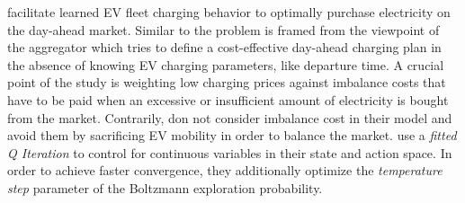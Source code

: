 \documentclass[12pt, article]{article}
\begin{document}
\textcite{vandael15_reinf_learn_heuris_ev_fleet} facilitate learned EV
fleet charging behavior to optimally purchase electricity on the day-ahead
market. Similar to \textcite{kahlen18_elect_vehic_virtual_power_plant_dilem}
the problem is framed from the viewpoint of the aggregator which tries to define a
cost-effective day-ahead charging plan in the absence of knowing EV charging
parameters, like departure time. A crucial point of the study is weighting low
charging prices against imbalance costs that have to be paid when an excessive or
insufficient  amount of electricity is bought from the market. Contrarily,
\textcite{kahlen18_elect_vehic_virtual_power_plant_dilem} don not consider imbalance
cost in their model and avoid them by sacrificing EV mobility in order to
balance the market. \textcite{vandael15_reinf_learn_heuris_ev_fleet} use a
\emph{fitted Q Iteration} to control for continuous variables in their state and
action space. In order to achieve faster convergence, they additionally optimize
the \emph{temperature step} parameter of the Boltzmann exploration probability.
\end{document}
